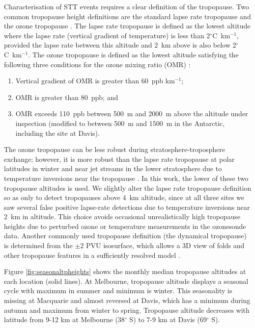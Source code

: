 \documentclass[acp, manuscript]{copernicus} %
\begin{document}
    Characterisation of STT events requires a clear definition of the tropopause.
    Two common tropopause height definitions are the standard lapse rate tropopause \citep{WMO1957} and the ozone tropopause \citep{Bethan1996}.
    The lapse rate tropopause is defined as the lowest altitude where the lapse rate (vertical gradient of temperature) is less than 2$^\circ$C~km$^{-1}$, provided the lapse rate between this altitude and 2~km above is also below 2$^\circ$C~km$^{-1}$.
    The ozone tropopause is defined as the lowest altitude satisfying the following three conditions for the ozone mixing ratio (OMR) \citep{Bethan1996}:
    \begin{enumerate}
      \item Vertical gradient of OMR is greater than 60~ppb km$^{-1}$;
      \item OMR is greater than 80~ppb; and
      \item OMR exceeds 110~ppb between 500~m and 2000~m above the altitude under inspection (modified to between 500~m and 1500~m in the Antarctic, including the site at Davis).
    \end{enumerate}
    The ozone tropopause can be less robust during stratosphere-troposphere exchange; however, it is more robust than the lapse rate tropopause at polar latitudes in winter and near jet streams in the lower stratosphere due to temperature inversions near the tropopause \citep{Bethan1996, Tomikawa2009, Alexander2013}.
    In this work, the lower of these two tropopause altitudes is used.
    We slightly alter the lapse rate tropopause definition so as only to detect tropopauses above 4~km altitude, since at all three sites we saw several false positive lapse-rate detections due to temperature inversions near 2~km in altitude.
    This choice avoids occasional unrealistically high tropopause heights due to perturbed ozone or temperature measurements in the ozonesonde data.
    Another commonly used tropopause definition (the dynamical tropopause) is determined from the $\pm 2$ PVU isosurface, which allows a 3D view of folds and other tropopause features in a sufficiently resolved model \citep{Skerlak2014}.
    
    Figure \ref{fig:seasonaltpheights} shows the monthly median tropopause altitudes at each location (solid lines).
    At Melbourne, tropopause altitude displays a seasonal cycle with maximum in summer and minimum is winter.
    This seasonality is missing at Macquarie and almost reversed at Davis, which has a minimum during autumn and maximum from winter to spring.
    Tropopause altitude decreases with latitude from 9-12 km at Melbourne (38$^\circ$ S) to 7-9 km at Davis (69$^\circ$ S).
\end{document}
